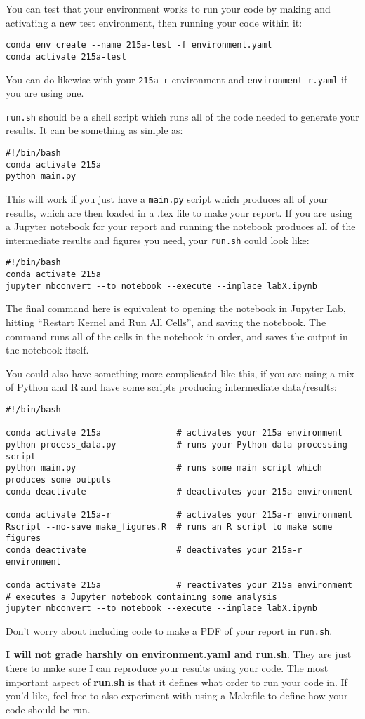 \documentclass[letterpaper,12pt]{article}
\begin{document}
You can test that your environment works to run your code by making and activating a new test environment, then running your code within it:
\begin{verbatim}
conda env create --name 215a-test -f environment.yaml
conda activate 215a-test
\end{verbatim}
You can do likewise with your \texttt{215a-r} environment and \texttt{environment-r.yaml} if you are using one.

\texttt{run.sh} should be a shell script which runs all of the code needed to generate your results. It can be something as simple as:
\begin{verbatim}
#!/bin/bash
conda activate 215a
python main.py
\end{verbatim}
This will work if you just have a \texttt{main.py} script which produces all of your results, which are then loaded in a .tex file to make your report. If you are using a Jupyter notebook for your report and running the notebook produces all of the intermediate results and figures you need, your \texttt{run.sh} could look like:
\begin{verbatim}
#!/bin/bash
conda activate 215a
jupyter nbconvert --to notebook --execute --inplace labX.ipynb
\end{verbatim}
The final command here is equivalent to opening the notebook in Jupyter Lab, hitting ``Restart Kernel and Run All Cells'', and saving the notebook. The command runs all of the cells in the notebook in order, and saves the output in the notebook itself.

You could also have something more complicated like this, if you are using a mix of Python and R and have some scripts producing intermediate data/results:
\begin{verbatim}
#!/bin/bash

conda activate 215a               # activates your 215a environment
python process_data.py            # runs your Python data processing script
python main.py                    # runs some main script which produces some outputs
conda deactivate                  # deactivates your 215a environment

conda activate 215a-r             # activates your 215a-r environment
Rscript --no-save make_figures.R  # runs an R script to make some figures
conda deactivate                  # deactivates your 215a-r environment

conda activate 215a               # reactivates your 215a environment
# executes a Jupyter notebook containing some analysis
jupyter nbconvert --to notebook --execute --inplace labX.ipynb
\end{verbatim}
Don't worry about including code to make a PDF of your report in \texttt{run.sh}.

\textbf{I will not grade harshly on environment.yaml and run.sh}. They are just there to make sure I can reproduce your results using your code. The most important aspect of \textbf{run.sh} is that it defines what order to run your code in. If you'd like, feel free to also experiment with using a Makefile to define how your code should be run.
\end{document}
